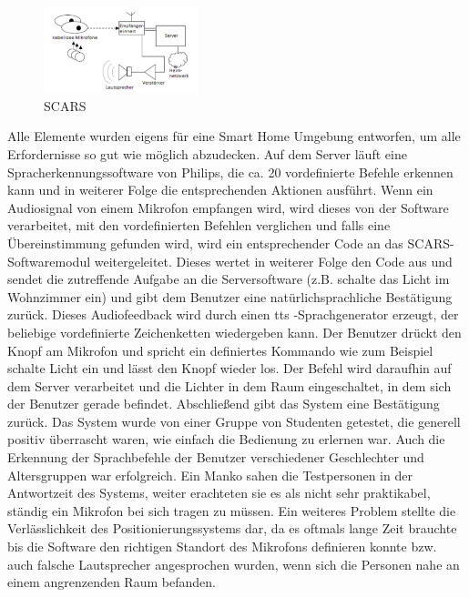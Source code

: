 \begin{figure}[h!]
	\centering
	\includegraphics[width=0.4\textwidth]{img/Feedback-Mechanismen/SCARS.png}
	\caption{SCARS}
	\label{fig:feedbackSCARS}
\end{figure}

Alle Elemente wurden eigens für eine Smart Home Umgebung entworfen, um alle Erfordernisse so
gut wie möglich abzudecken. Auf dem Server läuft eine Spracherkennungssoftware von Philips, die
ca. 20 vordefinierte Befehle erkennen kann und in weiterer Folge die entsprechenden Aktionen
ausführt.
Wenn ein Audiosignal von einem Mikrofon empfangen wird, wird dieses von der Software verarbeitet, mit den vordefinierten Befehlen verglichen und falls eine Übereinstimmung gefunden wird, wird ein entsprechender Code an das SCARS-Softwaremodul weitergeleitet. Dieses wertet in weiterer Folge den Code aus und sendet die zutreffende Aufgabe an die Serversoftware (z.B. schalte das Licht im Wohnzimmer ein) und gibt dem Benutzer eine natürlichsprachliche Bestätigung zurück.
Dieses Audiofeedback wird durch einen \gls{tts} -Sprachgenerator erzeugt, der beliebige vordefinierte Zeichenketten wiedergeben kann.
Der Benutzer drückt den Knopf am Mikrofon und spricht ein definiertes Kommando wie zum Beispiel
\glqq schalte Licht ein\grqq{} und lässt den Knopf wieder los. Der Befehl wird daraufhin auf dem Server verarbeitet und die Lichter in dem Raum eingeschaltet, in dem sich der Benutzer gerade befindet. Abschließend gibt das System eine Bestätigung zurück.
Das System wurde von einer Gruppe von Studenten getestet, die generell positiv überrascht waren, wie einfach die Bedienung zu erlernen war. Auch die Erkennung der Sprachbefehle der Benutzer verschiedener Geschlechter und Altersgruppen war erfolgreich. Ein Manko sahen die Testpersonen in der Antwortzeit des Systems, weiter erachteten sie es als nicht sehr praktikabel, ständig ein Mikrofon bei sich tragen zu müssen. Ein weiteres Problem stellte die Verlässlichkeit des Positionierungssystems dar, da es oftmals lange Zeit brauchte bis die Software den richtigen Standort des Mikrofons definieren konnte bzw. auch falsche Lautsprecher angesprochen wurden, wenn sich die Personen nahe an einem angrenzenden Raum befanden.


